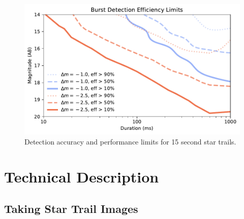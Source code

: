 \documentclass[12pt, letterpaper]{article}
\begin{document}
\begin{figure}[htb!]
\center
\includegraphics{f7.pdf}
\caption{Detection accuracy and performance limits for 15 second star trails.}
\label{fig:longlimit}
\end{figure}


\vspace{.6in}
\newpage
\section{Technical Description}
\label{sec:technical}

\subsection{Taking Star Trail Images}
\label{sec:overview}
\end{document}
